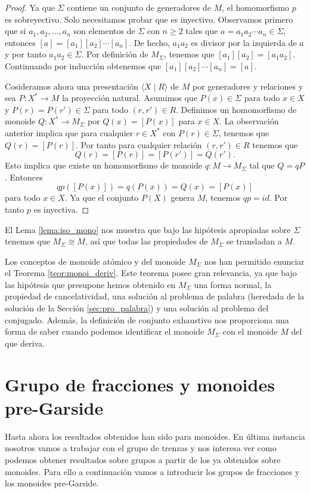 \documentclass[12pt]{book}
\theoremstyle{definition}
\begin{document}
\begin{proof} Ya que $\Sigma$ contiene un conjunto de generadores de $M$, el homomorfismo $p$ es sobreyectivo. Solo necesitamos probar que es inyectivo. Observamos primero que si $a_1,a_2,\ldots,a_n$ son elementos de $\Sigma$ con $n\geq 2$ tales que $a=a_1a_2\cdots a_n\in\Sigma$, entonces $[a]=[a_1][a_2]\cdots [a_n]$. De hecho, $a_1a_2$ es divisor por la izquierda de $a$ y por tanto $a_1a_2\in\Sigma$. Por definición de $M_\Sigma$, tenemos que $[a_1][a_2]=[a_1a_2]$. Continuando por inducción obtenemos que $[a_1][a_2]\cdots[a_n]=[a]$.

Cosideramos ahora una presentación $\langle X\mid R\rangle$ de $M$ por generadores y relaciones y sea $P:X^*\rightarrow M$ la proyección natural. Asumimos que $P(x)\in\Sigma$ para todo $x\in X$ y $P(r)=P(r')\in\Sigma$ para todo $(r,r')\in R$. Definimos un homomorfismo de monoide $Q:X^*\rightarrow M_\Sigma$ por $Q(x)=[P(x)]$ para $x\in X$. La observación anterior implica que para cualquier $r\in X^*$ con $P(r)\in\Sigma$, tenemos que $Q(r)=[P(r)]$. Por tanto para cualquier relación $(r,r')\in R$ tenemos que
$$Q(r)=[P(r)]=[P(r')]=Q(r').$$
Esto implica que existe un homomorfismo de monoide $q:M\rightarrow M_\Sigma$ tal que $Q=qP$. Entonces
$$qp([P(x)])=q(P(x))=Q(x)=[P(x)]$$
para todo $x\in X$. Ya que el conjunto $P(X)$ genera $M$, tenemos $qp=id$. Por tanto $p$ es inyectiva.
\end{proof}
El Lema \ref{lema:iso_mono} nos muestra que bajo las hipótesis apropiadas sobre $\Sigma$ tenemos que $M_\Sigma\cong M$, así que todas las propiedades de $M_\Sigma$ se transladan a $M$.

Los conceptos de monoide atómico y del monoide $M_\Sigma$ nos han permitido enunciar el Teorema \ref{teor:monoi_deriv}. Este teorema posee gran relevancia, ya que bajo las hipótesis que presupone hemos obtenido en $M_\Sigma$ una forma normal, la propiedad de cancelatividad, una solución al problema de palabra (heredada de la solución de la Sección \ref{sec:pro_palabra}) y una solución al problema del conjugado. Además, la definición de conjunto exhaustivo nos proporciona una forma de saber cuando podemos identificar el monoide $M_\Sigma$ con el monoide $M$ del que deriva.


\section{Grupo de fracciones y monoides pre-Garside}
Hasta ahora los resultados obtenidos han sido para monoides. En última instancia nosotros vamos a trabajar con el grupo de trenzas y nos interesa ver como podemos obtener resultados sobre grupos a partir de los ya obtenidos sobre monoides. Para ello a continuación vamos a introducir los grupos de fracciones y los monoides pre-Garside.
\end{document}
